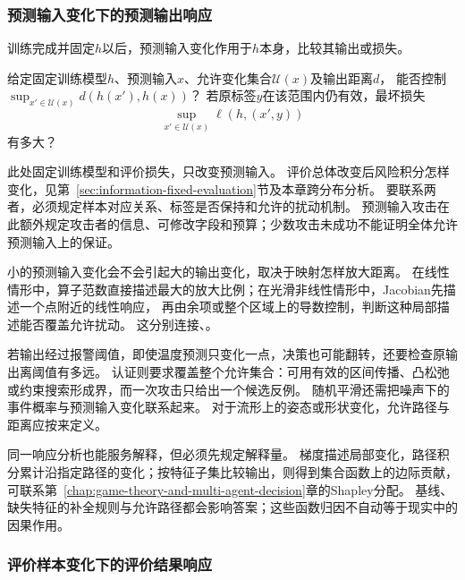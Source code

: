 \subsubsection{预测输入变化下的预测输出响应}
\label{sec:future-analysis-robustness}

训练完成并固定$h$以后，预测输入变化作用于$h$本身，比较其输出或损失。

\begin{mathproblem}[预测输入扰动的输出与损失响应]
  \label{question:future-robustness}
  给定固定训练模型$h$、预测输入$x$、允许变化集合$\mathcal U(x)$及输出距离$d$，
  能否控制$\sup_{x'\in\mathcal U(x)}d(h(x'),h(x))$？
  若原标签$y$在该范围内仍有效，最坏损失
  \[
    \sup_{x'\in\mathcal U(x)}\ell(h,(x',y))
  \]
  有多大？
\end{mathproblem}

此处固定训练模型和评价损失，只改变预测输入。
评价总体改变后风险积分怎样变化，见第~\ref{sec:information-fixed-evaluation}节及本章跨分布分析。
要联系两者，必须规定样本对应关系、标签是否保持和允许的扰动机制。
预测输入攻击在此额外规定攻击者的信息、可修改字段和预算；少数攻击未成功不能证明全体允许预测输入上的保证。

小的预测输入变化会不会引起大的输出变化，取决于映射怎样放大距离。
在线性情形中，算子范数直接描述最大的放大比例；在光滑非线性情形中，Jacobian先描述一个点附近的线性响应，
再由余项或整个区域上的导数控制，判断这种局部描述能否覆盖允许扰动。
这分别连接、。

若输出经过报警阈值，即使温度预测只变化一点，决策也可能翻转，还要检查原输出离阈值有多远。
认证则要求覆盖整个允许集合：可用有效的区间传播、凸松弛或约束搜索形成界，而一次攻击只给出一个候选反例。
随机平滑还需把噪声下的事件概率与预测输入变化联系起来。
对于流形上的姿态或形状变化，允许路径与距离应按来定义。

同一响应分析也能服务解释，但必须先规定解释量。
梯度描述局部变化，路径积分累计沿指定路径的变化；按特征子集比较输出，则得到集合函数上的边际贡献，
可联系第~\ref{chap:game-theory-and-multi-agent-decision}章的Shapley分配。
基线、缺失特征的补全规则与允许路径都会影响答案；这些函数归因不自动等于现实中的因果作用。

\subsubsection{评价样本变化下的评价结果响应}
\label{sec:future-analysis-evaluation-sample-response}

